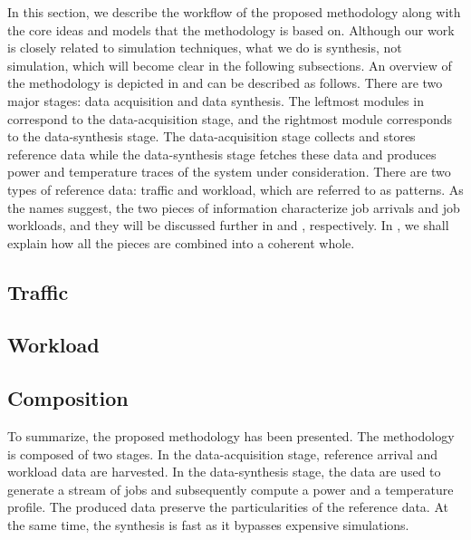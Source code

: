 In this section, we describe the workflow of the proposed methodology along with
the core ideas and models that the methodology is based on. Although our work is
closely related to simulation techniques, what we do is synthesis, not
simulation, which will become clear in the following subsections. An overview of
the methodology is depicted in  and can be described as
follows. There are two major stages: data acquisition and data synthesis. The
leftmost modules in  correspond to the data-acquisition stage,
and the rightmost module corresponds to the data-synthesis stage. The
data-acquisition stage collects and stores reference data while the
data-synthesis stage fetches these data and produces power and temperature
traces of the system under consideration. There are two types of reference data:
traffic and workload, which are referred to as patterns. As the names suggest,
the two pieces of information characterize job arrivals and job workloads, and
they will be discussed further in  and ,
respectively. In , we shall explain how all the pieces are
combined into a coherent whole.

\raggedbottom
\subsection{Traffic} 

\makeatletter
\afterpage{\global\let\@textbottom\relax \global\let\@texttop\relax}

\subsection{Workload} 


\subsection{Composition} 


To summarize, the proposed methodology has been presented. The methodology is
composed of two stages. In the data-acquisition stage, reference arrival and
workload data are harvested. In the data-synthesis stage, the data are used to
generate a stream of jobs and subsequently compute a power and a temperature
profile. The produced data preserve the particularities of the reference data.
At the same time, the synthesis is fast as it bypasses expensive simulations.
